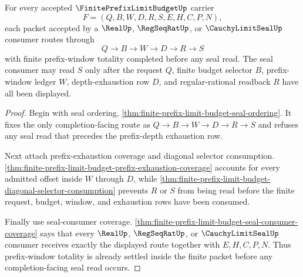 \begin{theorem}
\label{thm:finite-prefix-limit-budget-seal-window-route-totality}
For every accepted $\FinitePrefixLimitBudgetUp$ carrier
$$
F=(Q,B,W,D,R,S,E,H,C,P,N),
$$
each packet accepted by a $\RealUp$, $\RegSeqRatUp$, or $\CauchyLimitSealUp$ consumer routes through
$$
Q \to B \to W \to D \to R \to S
$$
with finite prefix-window totality completed before any seal read. The seal consumer may read $S$ only after the request $Q$, finite budget selector $B$, prefix-window ledger $W$, depth-exhaustion row $D$, and regular-rational readback $R$ have all been displayed.
\end{theorem}
\begin{proof}
Begin with seal ordering, \autoref{thm:finite-prefix-limit-budget-seal-ordering}. It fixes the only completion-facing route as $Q \to B \to W \to D \to R \to S$ and refuses any seal read that precedes the prefix-depth exhaustion row.

Next attach prefix-exhaustion coverage and diagonal selector consumption. \autoref{thm:finite-prefix-limit-budget-prefix-exhaustion-coverage} accounts for every admitted offset inside $W$ through $D$, while \autoref{thm:finite-prefix-limit-budget-diagonal-selector-consumption} prevents $R$ or $S$ from being read before the finite request, budget, window, and exhaustion rows have been consumed.

Finally use seal-consumer coverage. \autoref{thm:finite-prefix-limit-budget-seal-consumer-coverage} says that every $\RealUp$, $\RegSeqRatUp$, or $\CauchyLimitSealUp$ consumer receives exactly the displayed route together with $E,H,C,P,N$. Thus prefix-window totality is already settled inside the finite packet before any completion-facing seal read occurs.
\end{proof}

